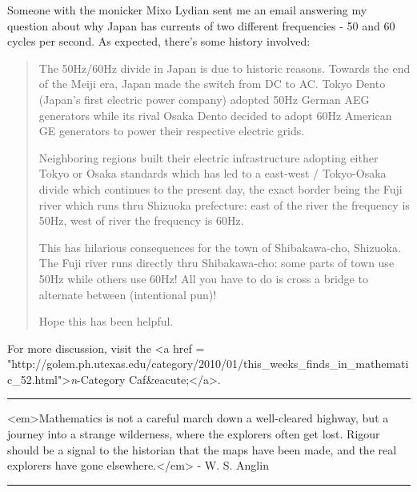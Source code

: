 Someone with the monicker Mixo Lydian sent me an email answering my question 
about why Japan has currents of two different frequencies - 50 and 
60 cycles per second.  As expected, there's some history involved:

\begin{quote}
The 50Hz/60Hz divide in Japan is due to historic reasons. Towards the 
end of the Meiji era, Japan made the switch from DC to AC. Tokyo Dento 
(Japan's first electric power company) adopted 50Hz German AEG generators 
while its rival Osaka Dento decided to adopt 60Hz American GE generators 
to power their respective electric grids.

Neighboring regions built their electric infrastructure adopting either 
Tokyo or Osaka standards which has led to a east-west / Tokyo-Osaka 
divide which continues to the present day, the exact border being the 
Fuji river which runs thru Shizuoka prefecture: east of the river the 
frequency is 50Hz, west of river the frequency is 60Hz.

This has hilarious consequences for the town of Shibakawa-cho, Shizuoka. 
The Fuji river runs directly thru Shibakawa-cho: some parts of town use 
50Hz while others use 60Hz! All you have to do is cross a bridge to 
alternate between (intentional pun)!

Hope this has been helpful.
\end{quote}

For more discussion, visit the <a href = "http://golem.ph.utexas.edu/category/2010/01/this_weeks_finds_in_mathematic_52.html">\emph{n}-Category Caf&eacute;</a>.


\par\noindent\rule{\textwidth}{0.4pt}
<em>Mathematics is not a careful march down a well-cleared highway, but a
journey into a strange wilderness, where the explorers often get lost.
Rigour should be a signal to the historian that the maps have been
made, and the real explorers have gone elsewhere.</em> - W. S. Anglin

\par\noindent\rule{\textwidth}{0.4pt}

